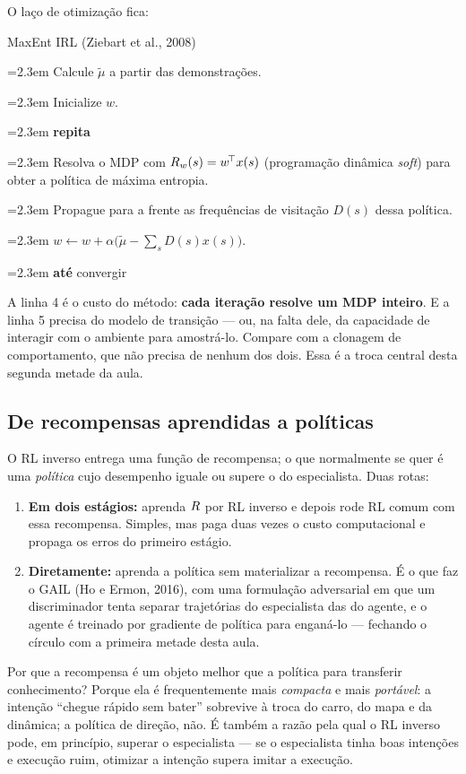 \documentclass[11pt]{article}
\newcommand{\feat}{x}
\newcommand{\mufeat}{\mu}
\newcommand{\wv}{w}
\newcounter{plin}
\newcommand{\pl}[2][0em]{%
  \stepcounter{plin}%
  \par\noindent
  \hangindent=2.3em \hangafter=1
  \makebox[1.6em][r]{\color{rlCinza}\scriptsize\theplin:}\hspace{0.5em}\hspace*{#1}\ignorespaces#2\par}
\newenvironment{pseudo}%
  {\par\setcounter{plin}{0}\small\setlength{\parskip}{0.3ex}}%
  {\par}
\begin{document}
O laço de otimização fica:

\begin{algbox}{MaxEnt IRL (Ziebart et al., 2008)}
\begin{pseudo}
\pl{Calcule $\tilde\mufeat$ a partir das demonstrações.}
\pl{Inicialize $\wv$.}
\pl{\textbf{repita}}
\pl[1.2em]{Resolva o MDP com $\rec_{\wv}(s) = \wv^{\!\top}\feat(s)$ (programação dinâmica
  \emph{soft}) para obter a política de máxima entropia.}
\pl[1.2em]{Propague para a frente as frequências de visitação $D(s)$ dessa política.}
\pl[1.2em]{$\wv \leftarrow \wv + \alpha\bigl(\tilde\mufeat - \sum_s D(s)\feat(s)\bigr)$.}
\pl{\textbf{até} convergir}
\end{pseudo}
\end{algbox}

\begin{alertabox}
  A linha 4 é o custo do método: \textbf{cada iteração resolve um MDP inteiro}. E a linha
  5 precisa do modelo de transição --- ou, na falta dele, da capacidade de interagir com
  o ambiente para amostrá-lo. Compare com a clonagem de comportamento, que não precisa de
  nenhum dos dois. Essa é a troca central desta segunda metade da aula.
\end{alertabox}

\subsection{De recompensas aprendidas a políticas}

O RL inverso entrega uma função de recompensa; o que normalmente se quer é uma
\emph{política} cujo desempenho iguale ou supere o do especialista. Duas rotas:

\begin{enumerate}
  \item \textbf{Em dois estágios:} aprenda $R$ por RL inverso e depois rode RL comum
    com essa recompensa. Simples, mas paga duas vezes o custo computacional e propaga os
    erros do primeiro estágio.
  \item \textbf{Diretamente:} aprenda a política sem materializar a recompensa. É o que
    faz o GAIL (Ho e Ermon, 2016), com uma formulação adversarial em que um discriminador
    tenta separar trajetórias do especialista das do agente, e o agente é treinado por
    gradiente de política para enganá-lo --- fechando o círculo com a primeira metade
    desta aula.
\end{enumerate}

\begin{ideiabox}
  Por que a recompensa é um objeto melhor que a política para transferir conhecimento?
  Porque ela é frequentemente mais \emph{compacta} e mais \emph{portável}: a intenção
  ``chegue rápido sem bater'' sobrevive à troca do carro, do mapa e da dinâmica; a
  política de direção, não. É também a razão pela qual o RL inverso pode, em princípio,
  superar o especialista --- se o especialista tinha boas intenções e execução ruim,
  otimizar a intenção supera imitar a execução.
\end{ideiabox}
\end{document}
